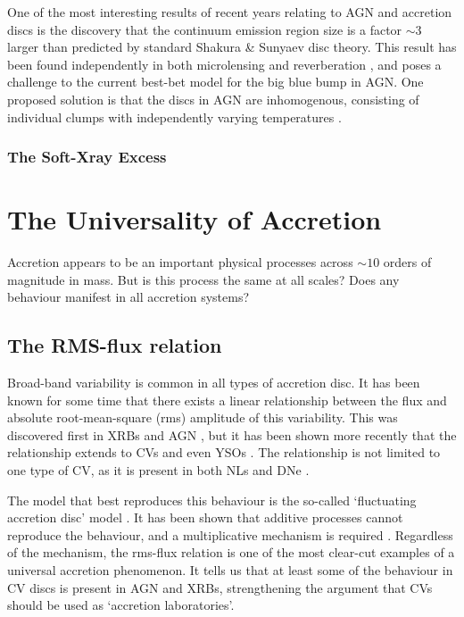 One of the most interesting results of recent years relating to AGN and accretion discs is
the discovery that the continuum emission region size is a factor $\sim3$ larger than
predicted by standard Shakura \& Sunyaev disc theory. This result
has been found independently in both microlensing \citep{morgan2010} 
and reverberation \citep{edelson2015}, and poses a challenge to the 
current best-bet model for the big blue bump in AGN. 
One proposed solution is that the discs in AGN are inhomogenous,
consisting of individual clumps with independently
varying temperatures \citep{dexteragol2011}.


\subsubsection{The Soft-Xray Excess}
\label{sec:sxxs}



\section{The Universality of Accretion}

Accretion appears to be an important physical processes across $\sim10$ orders
of magnitude in mass. But is this process the same at all scales? Does any 
behaviour manifest in all accretion systems? 

\subsection{The RMS-flux relation}

Broad-band variability is common in all types of accretion disc. It has been
known for some time that there exists a linear relationship
between the flux and absolute root-mean-square (rms) amplitude
of this variability. This was discovered first in XRBs and AGN 
\citep{uttley2001, uttley2005, heil2012}, but it has been shown
more recently that the relationship extends to CVs and even YSOs 
\citep{scaringi2012,scaringi2015a}. The relationship is not limited
to one type of CV, as it is present in both NLs and DNe \citep{vandesande2015}.
 
The model that best reproduces this behaviour is the so-called
`fluctuating accretion disc' model \citep{lyubarskii1997,kotov2001,
arevalo2006,hogg2015}. It has been shown that 
additive processes cannot reproduce the behaviour, and a multiplicative
mechanism is required \citep{uttley2005}. 
Regardless of the mechanism, the rms-flux relation is one of the most
clear-cut examples of a universal accretion phenomenon. 
It tells us that at least some of the behaviour in CV discs
is present in AGN and XRBs, strengthening the argument that CVs
should be used as `accretion laboratories'. 


